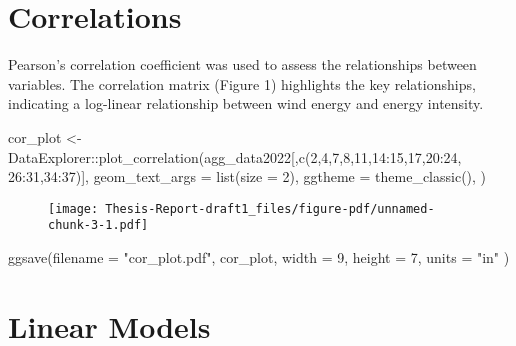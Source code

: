 \documentclass[
]{report}
\newenvironment{Shaded}{\begin{snugshade}}{\end{snugshade}}
\newcommand{\AttributeTok}[1]{\textcolor[rgb]{0.40,0.45,0.13}{#1}}
\newcommand{\DecValTok}[1]{\textcolor[rgb]{0.68,0.00,0.00}{#1}}
\newcommand{\FunctionTok}[1]{\textcolor[rgb]{0.28,0.35,0.67}{#1}}
\newcommand{\NormalTok}[1]{\textcolor[rgb]{0.00,0.23,0.31}{#1}}
\newcommand{\OtherTok}[1]{\textcolor[rgb]{0.00,0.23,0.31}{#1}}
\newcommand{\SpecialCharTok}[1]{\textcolor[rgb]{0.37,0.37,0.37}{#1}}
\newcommand{\StringTok}[1]{\textcolor[rgb]{0.13,0.47,0.30}{#1}}
\begin{document}
\hypertarget{correlations}{%
\section{Correlations}\label{correlations}}

Pearson's correlation coefficient was used to assess the relationships
between variables. The correlation matrix (Figure 1) highlights the key
relationships, indicating a log-linear relationship between wind energy
and energy intensity.

\begin{Shaded}
\begin{Highlighting}[]
\NormalTok{cor\_plot }\OtherTok{\textless{}{-}}\NormalTok{ DataExplorer}\SpecialCharTok{::}\FunctionTok{plot\_correlation}\NormalTok{(agg\_data2022[,}\FunctionTok{c}\NormalTok{(}\DecValTok{2}\NormalTok{,}\DecValTok{4}\NormalTok{,}\DecValTok{7}\NormalTok{,}\DecValTok{8}\NormalTok{,}\DecValTok{11}\NormalTok{,}\DecValTok{14}\SpecialCharTok{:}\DecValTok{15}\NormalTok{,}\DecValTok{17}\NormalTok{,}\DecValTok{20}\SpecialCharTok{:}\DecValTok{24}\NormalTok{, }\DecValTok{26}\SpecialCharTok{:}\DecValTok{31}\NormalTok{,}\DecValTok{34}\SpecialCharTok{:}\DecValTok{37}\NormalTok{)], }
                               \AttributeTok{geom\_text\_args =} \FunctionTok{list}\NormalTok{(}\AttributeTok{size =} \DecValTok{2}\NormalTok{), }
                               \AttributeTok{ggtheme =} \FunctionTok{theme\_classic}\NormalTok{(), }
\NormalTok{                               )}
\end{Highlighting}
\end{Shaded}

\begin{figure}[H]

{\centering \texttt{[image: Thesis-Report-draft1\_files/figure-pdf/unnamed-chunk-3-1.pdf]}

}

\end{figure}

\begin{Shaded}
\begin{Highlighting}[]
\FunctionTok{ggsave}\NormalTok{(}\AttributeTok{filename =} \StringTok{"cor\_plot.pdf"}\NormalTok{, cor\_plot, }\AttributeTok{width =} \DecValTok{9}\NormalTok{, }\AttributeTok{height =} \DecValTok{7}\NormalTok{, }\AttributeTok{units =} \StringTok{"in"}\NormalTok{ )}
\end{Highlighting}
\end{Shaded}

\hypertarget{linear-models}{%
\section{Linear Models}\label{linear-models}}
\end{document}
